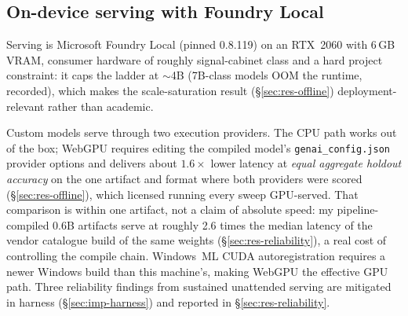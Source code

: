 \subsection{On-device serving with Foundry Local}\label{sec:imp-foundry}
Serving is Microsoft Foundry Local (pinned 0.8.119) on an RTX~2060 with
6\,GB VRAM, consumer hardware of roughly signal-cabinet class and a hard
project constraint: it caps the ladder at $\sim$4B (7B-class models OOM
the runtime, recorded), which makes the scale-saturation result
(\S\ref{sec:res-offline}) deployment-relevant rather than academic.

Custom models serve through two execution providers. The CPU path works
out of the box; WebGPU requires editing the compiled model's
\texttt{genai\_config.json} provider options and delivers about
$1.6\times$ lower latency at \emph{equal aggregate holdout accuracy} on the
one artifact and format where both providers were scored
(\S\ref{sec:res-offline}), which licensed running every sweep GPU-served.
That comparison is within one artifact, not a claim of absolute speed: my
pipeline-compiled 0.6B artifacts serve at roughly 2.6 times the median
latency of the vendor catalogue build of the same weights
(\S\ref{sec:res-reliability}), a real cost of controlling the compile
chain. Windows~ML CUDA autoregistration requires a newer Windows build than
this machine's, making WebGPU the effective GPU path. Three reliability
findings from sustained unattended serving are mitigated in harness
(\S\ref{sec:imp-harness}) and reported in \S\ref{sec:res-reliability}.
